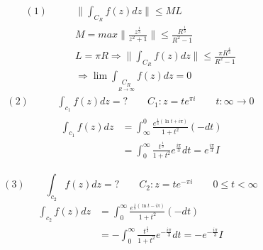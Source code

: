 \begin{align*}
(1) \quad \quad & \| \int_{C_{R}}f(z)dz\| \leq ML \\
&M=max\|\frac{z^{\frac{1}{3}}}{z^{2}+1}\| \leq \frac{R^{\frac{1}{3}}}{R^{2}-1} \\
&L=\pi R \Rightarrow \| \int_{C_{R}}f(z)dz\| \leq \frac{\pi R^{\frac{4}{3}}}{R^{2}-1} \\
&\Rightarrow \lim \int_{
\underset{R \rightarrow \infty}{C_R}}
f(z)dz =0
\end{align*}
\begin{align*}
	(2) \quad \quad &\int_{c_{1}} f(z) d z =?\quad \quad C_{1}:z=t e^{\pi i} \quad \quad t: \infty \rightarrow 0 \\ 
	&\begin{aligned} \int_{c_{1}} f(z) d z &=\int_{\infty}^{0} \frac{e^{\frac{1}{3}(\ln t+i \pi)}}{1+t^{2}}(-d t) \\ &=\int_{0}^{\infty} \frac{t^{\frac{1}{3}}}{1+t^{2}} e^{\frac{i \pi}{3}} d t=e^{\frac{i \pi}{3}} I \end{aligned}
\end{align*}

\begin{equation*}
(3) \quad \quad \int_{c_{2}} f(z) d z =?\quad \quad C_{2}:z=t e^{-\pi i} \quad \quad 0\leq t < \infty	
\end{equation*}
\begin{equation*}
	\begin{aligned} \int_{c_{2}} f(z) d z &=\int_{0}^{\infty} \frac{e^{\frac{1}{3}(\ln t-i \pi)}}{1+t^{2}}(-d t) \\ &=-\int_{0}^{\infty} \frac{t^{\frac{1}{3}}}{1+t^{2}} e^{-\frac{i \pi}{3}} d t=-e^{-\frac{i \pi}{3}} I \end{aligned}
\end{equation*}

